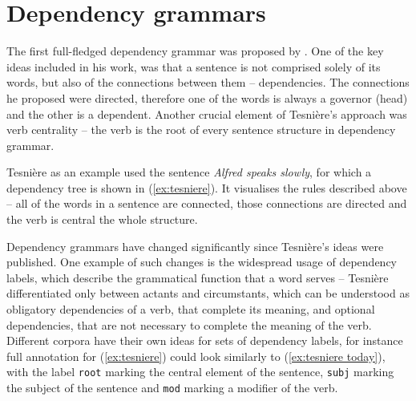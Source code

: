 \section{Dependency grammars}
The first full-fledged dependency grammar was proposed by \cite{tesniere}. One of the key ideas included in his work, was that a sentence is not comprised solely of its words, but also of the connections between them -- dependencies. The connections he proposed were directed, therefore one of the words is always a governor (head) and the other is a dependent. Another crucial element of Tesnière's approach was verb centrality -- the verb is the root of every sentence structure in dependency grammar. 

\begin{center}
\begin{exe}
	\ex{}
\end{exe}
\end{center}

Tesnière as an example used the sentence \textsl{Alfred speaks slowly}, for which a dependency tree is shown in (\ref{ex:tesniere}). It visualises the rules described above -- all of the words in a sentence are connected, those connections are directed and the verb is central the whole structure. 

Dependency grammars have changed significantly since Tesnière's ideas were published. One example of such changes is the widespread usage of dependency labels, which describe the grammatical function that a word serves -- Tesnière differentiated only between actants and circumstants, which can be understood as obligatory dependencies of a verb, that complete its meaning, and optional dependencies, that are not necessary to complete the meaning of the verb. Different corpora have their own ideas for sets of dependency labels, for instance full annotation for (\ref{ex:tesniere}) could look similarly to (\ref{ex:tesniere today}), with the label \texttt{root} marking the central element of the sentence, \texttt{subj} marking the subject of the sentence and \texttt{mod} marking a modifier of the verb.

